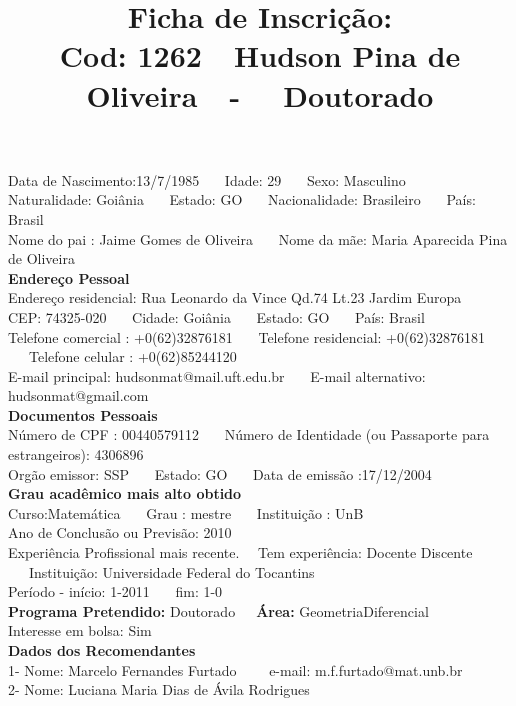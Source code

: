 \documentclass[11pt]{article}
\title{\vspace*{-4cm} Ficha de Inscrição: \\Cod: 1262\ \ Hudson Pina de Oliveira\ \ - \ \ Doutorado 
 }
\date{}
\begin{document}
\maketitle
\vspace*{-1.5cm}
\noindent Data de Nascimento:13/7/1985
\ \ \ Idade: 29   \ \ \ Sexo: Masculino
\\
Naturalidade: Goiânia  
\ \ \  Estado: GO
\ \ \  Nacionalidade: Brasileiro
\ \ \ País: Brasil
\\        
Nome do pai : Jaime Gomes de Oliveira
\ \ \ Nome da mãe: Maria Aparecida Pina de Oliveira          
\\[0.2cm]                     
\textbf{Endereço Pessoal} 
\\ 
\noindent Endereço residencial: Rua Leonardo da Vince Qd.74 Lt.23 Jardim Europa
\\
        CEP: 74325-020 
\ \ \ Cidade: Goiânia 
\ \ \ Estado: GO 
\ \ \ País: Brasil
\\		
		Telefone comercial : +0(62)32876181
\ \ \ Telefone residencial: +0(62)32876181
\ \ \ Telefone celular : +0(62)85244120
\\
E-mail principal: hudsonmat@mail.uft.edu.br
\ \ \ E-mail alternativo: hudsonmat@gmail.com 
\\[0.2cm] 
\textbf{Documentos Pessoais}
\\
\noindent Número de CPF : 00440579112
\ \ \ Número de Identidade (ou Passaporte para estrangeiros): 4306896
\\
Orgão emissor: SSP
\ \ \ Estado: GO
\ \ \ Data de emissão :17/12/2004
\\[0.3cm]
\textbf{Grau acadêmico mais alto obtido}
\\	
Curso:Matemática
\ \ \ Grau : mestre
\ \ \ Instituição : UnB
\\			
Ano de Conclusão ou Previsão: 2010
\\ 
Experiência Profissional mais recente. \ \  
Tem experiência: Docente Discente  
\ \ \ Instituição: Universidade Federal do Tocantins
\\  
Período - início: 1-2011
\ \ \ fim: 1-0
\\[0.2cm] 
\textbf{Programa Pretendido:} Doutorado\ \ \ \textbf{Área:} GeometriaDiferencial\\
Interesse em bolsa: Sim
\\[0.3cm]		
\textbf{Dados dos Recomendantes} 
\\
1- Nome: Marcelo Fernandes Furtado
\ \ \ \  e-mail: m.f.furtado@mat.unb.br 
\\
2- Nome: Luciana Maria Dias de Ávila Rodrigues
\end{document}
